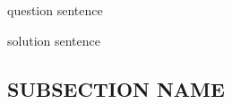 \begin{questions}
	\question question sentence
	\begin{solution}
		solution sentence
	\end{solution}
\end{questions}

%
\subsection{SUBSECTION NAME}

